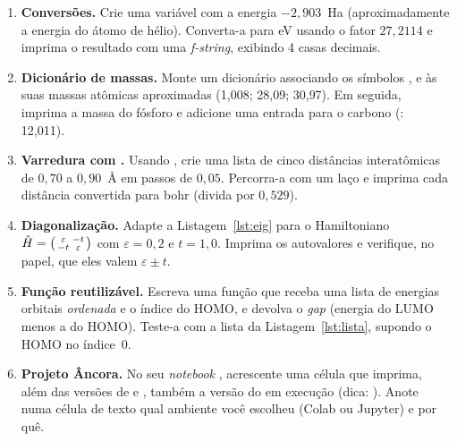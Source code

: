 \begin{enumerate}[leftmargin=*,label=\textbf{1.\arabic*}]
  \item \textbf{Conversões.} Crie uma variável com a energia
        $-2{,}903$~Ha (aproximadamente a energia do átomo de hélio). Converta-a
        para eV usando o fator $27{,}2114$ e imprima o resultado com uma
        \emph{f-string}, exibindo 4 casas decimais.

  \item \textbf{Dicionário de massas.} Monte um dicionário associando os símbolos
        ,  e  às suas massas atômicas aproximadas
        (1{,}008; 28{,}09; 30{,}97). Em seguida, imprima a massa do fósforo e
        adicione uma entrada para o carbono (: 12{,}011).

  \item \textbf{Varredura com .} Usando , crie uma lista de
        cinco distâncias interatômicas de $0{,}70$ a $0{,}90$~Å em passos de
        $0{,}05$. Percorra-a com um laço  e imprima cada distância
        convertida para bohr (divida por $0{,}529$).

  \item \textbf{Diagonalização.} Adapte a Listagem~\ref{lst:eig} para o
        Hamiltoniano
        $\hat H = \begin{psmallmatrix} \varepsilon & -t \\ -t & \varepsilon
        \end{psmallmatrix}$ com $\varepsilon = 0{,}2$ e $t = 1{,}0$. Imprima os
        autovalores e verifique, no papel, que eles valem $\varepsilon \pm t$.

  \item \textbf{Função reutilizável.} Escreva uma função
         que receba uma lista de energias orbitais
        \emph{ordenada} e o índice do HOMO, e devolva o \emph{gap}
        (energia do LUMO menos a do HOMO). Teste-a com a lista da
        Listagem~\ref{lst:lista}, supondo o HOMO no índice~0.

  \item \textbf{Projeto Âncora.} No seu \emph{notebook}
        , acrescente uma célula que imprima, além
        das versões de \numpy{} e \pyscf{}, também a versão do \python{} em
        execução (dica: ). Anote numa célula de
        texto qual ambiente você escolheu (Colab ou Jupyter) e por quê.
\end{enumerate}
